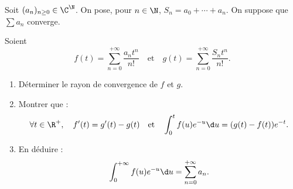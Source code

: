 \begin{enonce}
\begin{exercise}[ID={RMS135 E1472},subtitle={Navale MP 2024},tags={},difficulty={}]

  Soit $(a_n)_{n \geq 0} \in \C^{\N}$.
  On pose, pour $n \in \N$, $S_n = a_0 + \cdots + a_n$.
  On suppose que $\sum a_n$ converge.

Soient 
\begin{equation*}
f(t) = \sum_{n=0}^{+\infty} \frac{a_n t^n}{n!}
\quad \text{et} \quad
g(t) = \sum_{n=0}^{+\infty} \frac{S_n t^n}{n!}.
\end{equation*}

\begin{enumerate}
  \item Déterminer le rayon de convergence de $f$ et $g$.
  \item Montrer que :
  \begin{equation*}
  \forall t \in \R^+, \quad f'(t) = g'(t) - g(t)
  \quad \text{et} \quad
  \int_0^t f(u) e^{-u} \d u = (g(t) - f(t)) e^{-t}.
  \end{equation*}
  \item En déduire :
  \begin{equation*}
  \int_0^{+\infty} f(u) e^{-u} \d u = \sum_{n=0}^{+\infty} a_n.
  \end{equation*}
\end{enumerate}

\end{exercise}
\begin{solution}
\end{solution}
\end{enonce}
